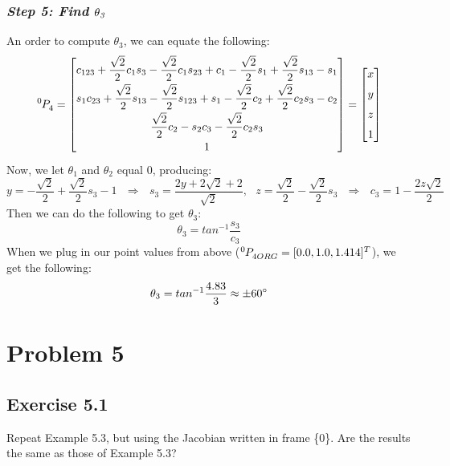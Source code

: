 \documentclass[10pt]{article}
\begin{document}
\subsubsection*{\textbf{\textit{Step 5: Find }}$\bf{\it{\theta_{3}}}$}
An order to compute $\theta_{3}$, we can equate the following:
\[
\tensor*[^{0}]{P}{_{4}} =
\begin{bmatrix}
   c_{123} + \dfrac{\sqrt{2}}{2}c_{1}s_{3} - \dfrac{\sqrt{2}}{2}c_{1}s_{23}  +  c_{1} - \dfrac{\sqrt{2}}{2}s_{1} + \dfrac{\sqrt{2}}{2} s_{13} -  s_{1} 
   \\[6pt]
   s_{1}c_{23} + \dfrac{\sqrt{2}}{2}s_{13} - \dfrac{\sqrt{2}}{2} s_{123}  +  s_{1} - \dfrac{\sqrt{2}}{2}c_{2} + \dfrac{\sqrt{2}}{2}c_{2}s_{3} - c_{2} 
   \\[6pt]
   \dfrac{\sqrt{2}}{2}c_{2} - s_{2}c_{3} - \dfrac{\sqrt{2}}{2}c_{2}s_{3} 
   \\[6pt]
   1
\end{bmatrix} = 
\begin{bmatrix}
   x\\[6pt]
   y\\[6pt]
   z\\[6pt]
   1
\end{bmatrix}
\]
Now, we let $\theta_{1}$ and $\theta_{2}$ equal 0, producing:
\[
y = -\dfrac{\sqrt{2}}{2}+\dfrac{\sqrt{2}}{2}s_{3} - 1
\mbox{    }\Rightarrow\mbox{    }
s_{3} = \dfrac{2y + 2\sqrt{2} + 2}{\sqrt{2}},
\mbox{                }
z = \dfrac{\sqrt{2}}{2} - \dfrac{\sqrt{2}}{2}s_{3}
\mbox{    }\Rightarrow\mbox{    }
c_{3} = 1 - \dfrac{2z\sqrt{2}}{2}
\]
Then we can do the following to get $\theta_{3}$:
\[
\theta_{3} = tan^{-1}\dfrac{s_{3}}{c_{3}}
\]
When we plug in our point values from above ($\tensor*[^{0}]{P}{_{4ORG}} = [0.0, 1.0, 1.414]^T$), we get the following:
\[
\theta_{3} = tan^{-1}\dfrac{4.83}{3} \approx \pm 60\degree
\]
\section*{Problem 5}
\subsection*{Exercise 5.1}
Repeat Example 5.3, but using the Jacobian written in frame \{0\}. Are the results the same as those of Example 5.3?
\end{document}
